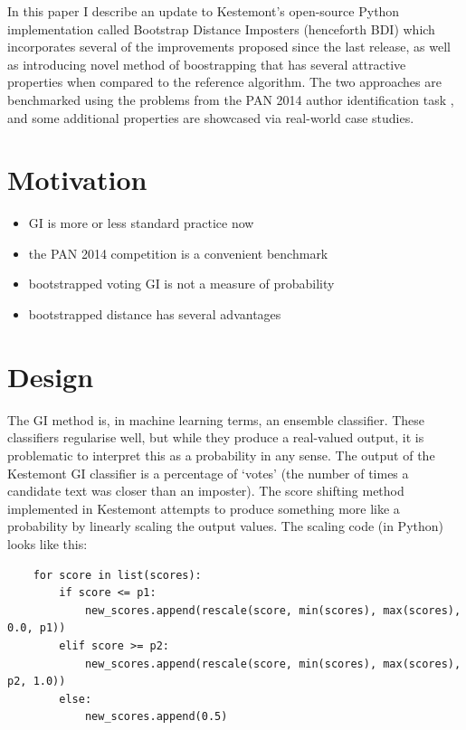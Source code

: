 \documentclass[
    hf,
]{ceurart}
\begin{document}
In this paper I describe an update to Kestemont's open-source Python
implementation called Bootstrap Distance Imposters (henceforth BDI) which
incorporates several of the improvements proposed since the last release, as
well as introducing novel method of boostrapping that has several attractive
properties when compared to the reference algorithm. The two approaches are
benchmarked using the problems from the PAN 2014 author identification task
\cite{pan_2014}, and some additional properties are showcased via real-world
case studies.

\section{Motivation}
\begin{itemize}
    \item GI is more or less standard practice now
    \item the PAN 2014 competition is a convenient benchmark
    \item bootstrapped voting GI is not a measure of probability
    \item bootstrapped distance has several advantages
\end{itemize}
\section{Design}

The GI method is, in machine learning terms, an ensemble classifier. These
classifiers regularise well, but while they produce a real-valued output, it is
problematic to interpret this as a probability in any sense. The output of the
Kestemont GI classifier is a percentage of `votes' (the number of times a
candidate text was closer than an imposter). The score shifting method
implemented in Kestemont attempts to produce something more like a probability
by linearly scaling the output values. The scaling code (in Python) looks like this:
\begin{verbatim}
    for score in list(scores):
        if score <= p1:
            new_scores.append(rescale(score, min(scores), max(scores), 0.0, p1))
        elif score >= p2:
            new_scores.append(rescale(score, min(scores), max(scores), p2, 1.0))
        else:
            new_scores.append(0.5)
\end{verbatim}
\end{document}
